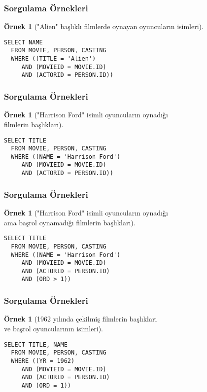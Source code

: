 \documentclass[dvipsnames]{beamer}
\theoremstyle{definition}
\theoremstyle{example}
\newtheorem{ornek}[theorem]{Örnek}
\theoremstyle{plain}
\begin{document}
\begin{frame}[fragile]
  \frametitle{Sorgulama Örnekleri}

  \begin{ornek}["Alien" başlıklı filmlerde oynayan oyuncuların isimleri]
     \begin{lstlisting}
SELECT NAME
  FROM MOVIE, PERSON, CASTING
  WHERE ((TITLE = 'Alien')
     AND (MOVIEID = MOVIE.ID)
     AND (ACTORID = PERSON.ID))
      \end{lstlisting}
    \end{ornek}
\end{frame}

\begin{frame}[fragile]
  \frametitle{Sorgulama Örnekleri}

  \begin{ornek}["Harrison Ford" isimli oyuncuların oynadığı\\
                filmlerin başlıkları]
    \begin{lstlisting}
SELECT TITLE
  FROM MOVIE, PERSON, CASTING
  WHERE ((NAME = 'Harrison Ford')
     AND (MOVIEID = MOVIE.ID)
     AND (ACTORID = PERSON.ID))
    \end{lstlisting}
  \end{ornek}
\end{frame}

\begin{frame}[fragile]
  \frametitle{Sorgulama Örnekleri}

  \begin{ornek}["Harrison Ford" isimli oyuncuların oynadığı\\
                ama başrol oynamadığı filmlerin başlıkları]
    \begin{lstlisting}
SELECT TITLE
  FROM MOVIE, PERSON, CASTING
  WHERE ((NAME = 'Harrison Ford')
     AND (MOVIEID = MOVIE.ID)
     AND (ACTORID = PERSON.ID)
     AND (ORD > 1))
    \end{lstlisting}
  \end{ornek}
\end{frame}

\begin{frame}[fragile]
  \frametitle{Sorgulama Örnekleri}

  \begin{ornek}[1962 yılında çekilmiş filmlerin başlıkları\\
                ve başrol oyuncularının isimleri]
    \begin{lstlisting}
SELECT TITLE, NAME
  FROM MOVIE, PERSON, CASTING
  WHERE ((YR = 1962)
     AND (MOVIEID = MOVIE.ID)
     AND (ACTORID = PERSON.ID)
     AND (ORD = 1))
    \end{lstlisting}
  \end{ornek}
\end{frame}
\end{document}

